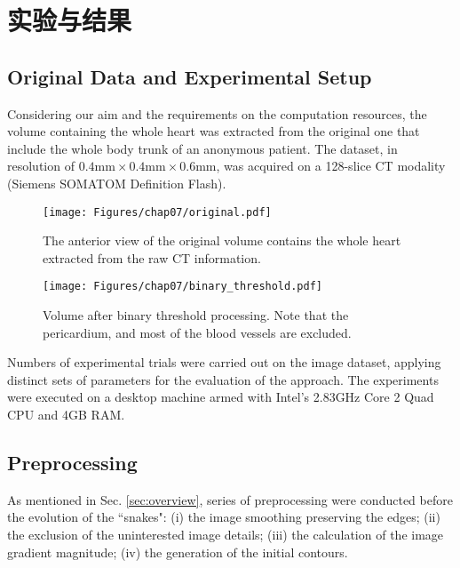 \section{实验与结果}
\label{sec7-3}

\subsection{Original Data and Experimental Setup}

Considering our aim and the requirements on the computation resources, the volume containing the whole heart was extracted from the original one that include the whole body trunk of an anonymous patient. %
The dataset, in resolution of $0.4\text{mm} \times 0.4\text{mm} \times 0.6\text{mm}$, was acquired on a 128-slice CT modality (Siemens SOMATOM Definition Flash).
\begin{figure}[t]
\centering
\texttt{[image: Figures/chap07/original.pdf]}
\caption{The anterior view of the original volume contains the whole heart extracted from the raw CT information.}
\label{fig:Original}
\end{figure}
\begin{figure}[t]
\centering
\texttt{[image: Figures/chap07/binary\_threshold.pdf]}
\caption{Volume after binary threshold processing. Note that the pericardium, and most of the blood vessels are excluded.}%
\label{fig:BinaryThreshold}
\end{figure}

Numbers of experimental trials were carried out on the image dataset, applying distinct sets of parameters for the evaluation of the approach.
The experiments were executed on a desktop machine armed with Intel's 2.83GHz Core 2 Quad CPU and 4GB RAM.

\subsection{Preprocessing}

As mentioned in Sec. \ref{sec:overview}, series of preprocessing were conducted before the evolution of the ``snakes":
(i) the image smoothing preserving the edges;
(ii) the exclusion of the uninterested image details;
(iii) the calculation of the image gradient magnitude;
(iv) the generation of the initial contours.

